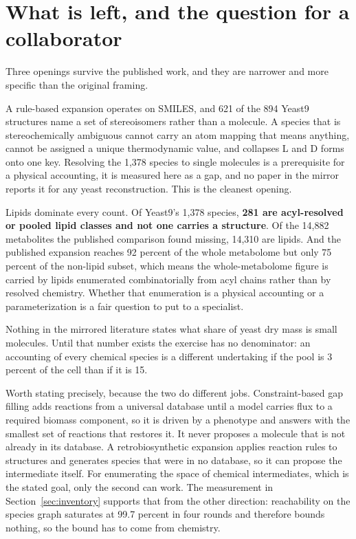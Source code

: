 
\section{What is left, and the question for a collaborator}
\label{sec:open}

Three openings survive the published work, and they are narrower and more specific than the
original framing.

A rule-based expansion operates on SMILES, and 621 of the 894 Yeast9 structures name a set of
stereoisomers rather than a molecule. A species that is stereochemically ambiguous cannot
carry an atom mapping that means anything, cannot be assigned a unique thermodynamic value,
and collapses L and D forms onto one key. Resolving the 1{,}378 species to single molecules is
a prerequisite for a physical accounting, it is measured here as a gap, and no paper in the
mirror reports it for any yeast reconstruction. This is the cleanest opening.

Lipids dominate every count. Of Yeast9's 1{,}378 species, \textbf{281 are acyl-resolved or
pooled lipid classes and not one carries a structure}. Of the 14{,}882 metabolites the
published comparison found missing, 14{,}310 are lipids. And the published expansion reaches
92 percent of the whole metabolome but only 75 percent of the non-lipid subset, which means
the whole-metabolome figure is carried by lipids enumerated combinatorially from acyl chains
rather than by resolved chemistry. Whether that enumeration is a physical accounting or a
parameterization is a fair question to put to a specialist.

Nothing in the mirrored literature states what share of yeast dry mass is small molecules.
Until that number exists the exercise has no denominator: an accounting of every chemical
species is a different undertaking if the pool is 3 percent of the cell than if it is 15.

Worth stating precisely, because the two do different jobs. Constraint-based gap filling adds
reactions from a universal database until a model carries flux to a required biomass
component, so it is driven by a phenotype and answers with the smallest set of reactions that
restores it. It never proposes a molecule that is not already in its database. A
retrobiosynthetic expansion applies reaction rules to structures and generates species that
were in no database, so it can propose the intermediate itself. For enumerating the space of
chemical intermediates, which is the stated goal, only the second can work. The measurement in
Section~\ref{sec:inventory} supports that from the other direction: reachability on the
species graph saturates at 99.7 percent in four rounds and therefore bounds nothing, so the
bound has to come from chemistry.

